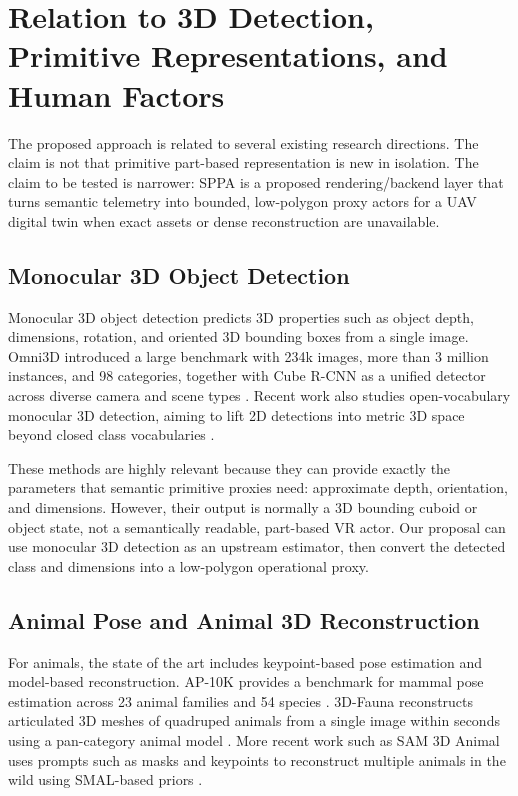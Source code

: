 ﻿\documentclass[11pt,a4paper]{article}
\begin{document}
\section{Relation to 3D Detection, Primitive Representations, and Human Factors}

The proposed approach is related to several existing research directions. The
claim is not that primitive part-based representation is new in isolation. The
claim to be tested is narrower: SPPA is a proposed rendering/backend layer that
turns semantic telemetry into bounded, low-polygon proxy actors for a UAV
digital twin when exact assets or dense reconstruction are unavailable.

\subsection{Monocular 3D Object Detection}

Monocular 3D object detection predicts 3D properties such as object depth,
dimensions, rotation, and oriented 3D bounding boxes from a single image.
Omni3D introduced a large benchmark with 234k images, more than 3 million
instances, and 98 categories, together with Cube R-CNN as a unified detector
across diverse camera and scene types \cite{brazil2022omni3d}. Recent work also
studies open-vocabulary monocular 3D detection, aiming to lift 2D detections
into metric 3D space beyond closed class vocabularies
\cite{yao2024ovmono3d}.

These methods are highly relevant because they can provide exactly the
parameters that semantic primitive proxies need: approximate depth, orientation,
and dimensions. However, their output is normally a 3D bounding cuboid or object
state, not a semantically readable, part-based VR actor. Our proposal can use
monocular 3D detection as an upstream estimator, then convert the detected class
and dimensions into a low-polygon operational proxy.

\subsection{Animal Pose and Animal 3D Reconstruction}

For animals, the state of the art includes keypoint-based pose estimation and
model-based reconstruction. AP-10K provides a benchmark for mammal pose
estimation across 23 animal families and 54 species \cite{yu2021ap10k}.
3D-Fauna reconstructs articulated 3D meshes of quadruped animals from a single
image within seconds using a pan-category animal model \cite{li20243dfauna}.
More recent work such as SAM 3D Animal uses prompts such as masks and keypoints
to reconstruct multiple animals in the wild using SMAL-based priors
\cite{hu2026sam3danimal}.
\end{document}

